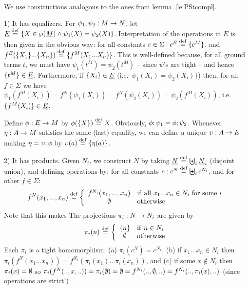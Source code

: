 \documentclass[10pt]{article}
\begin{document}
\begin{Proof}
We use constructions analogous to the ones from
lemma~\ref{le:PStcompl}.

1) It has equalizers. For $\psi_1,\psi_2:M\rightarrow N$, let $\underline {E}\stackrel{{\rm \tiny{def}}}=
\{X\in\wp(\underline {M})\land\psi_1(X)=\psi_2(X)\}$. Interpretation of
the operations in $E$ is then given in the obvious way: for all
constants $c\in\Sigma: c^E\stackrel{{\rm \tiny{def}}}= \{c^M\}$, and $f^E(\{X_1\}...\{X_n\})
\stackrel{{\rm \tiny{def}}}= \{f^M(X_1...X_n)\}$.  This is well-defined because, for all
ground terms $t$, we must have $\psi_1(t^M)=\psi_2(t^M)$ -- since
$\psi$'s are tight -- and hence $\{t^M\}\in\underline {E}$.  Furthermore, if
$\{X_i\}\in\underline {E}$ (i.e.\ $\psi_1(X_i)=\psi_2(X_i)\}$) then, for all
$f\in\Sigma$ we have
$\psi_1(f^M(X_i))=f^N(\psi_1(X_i))=f^N(\psi_2(X_i))=\psi_2(f^M(X_i))$,
i.e.\ $\{f^M(X_i)\}\in \underline {E}$.

Define $\phi:E\rightarrow M$ by $\phi(\{X\})\stackrel{{\rm \tiny{def}}}= X$. Obviously,
$\phi;\psi_1=\phi;\psi_2$. Whenever $\eta:A\rightarrow M$
satisfies the same (last) equality, we can define a unique
$\upsilon:A\rightarrow E$ making $\eta=\upsilon;\phi$ by
$\upsilon(a)\stackrel{{\rm \tiny{def}}}=\{\eta(a)\}$.

2) It has products. Given $N_i$, we construct $N$ by taking $\underline {N}\stackrel{{\rm \tiny{def}}}= \biguplus_i \underline {N}_i$ (disjoint union), and defining operations
by: for all constants $c:c^N\stackrel{{\rm \tiny{def}}}= \biguplus_i c^{N_i}$, and for other
$f\in\Sigma:$
\[ 
f^N(x_1,...,x_n)\stackrel{{\rm \tiny{def}}}= 
\left \{ \begin{array}{cl}
         f^{N_i}(x_1,...,x_n) 
         & {\rm if\ all\ } x_1...x_n\in N_i {\rm \ for\ some\ }i \\ 
         \emptyset 
         & {\rm otherwise} 
         \end{array} 
      \right.
\]
Note that this makes 
The projections $\pi_i:N\rightarrow N_i$ are given by 
\[
\pi_i(n)\stackrel{{\rm \tiny{def}}}= \left \{ \begin{array}{cl} \{n\} & {\rm if\ } n\in N_i \\
\emptyset & {\rm otherwise} \end{array} \right.
\]
Each $\pi_i$ is a tight homomorphism: (a) $\pi_i(c^N)=c^{N_i}$, (b) if
$x_1...x_n\in N_i$ then
$\pi_i(f^N(x_1...x_n))=f^{N_i}(\pi_i(x_1)...\pi_i(x_n))$, and (c) if
some $x\not\in N_i$ then $\pi_i(x)=\emptyset$ so
$\pi_i(f^N(..,x,..))=\pi_i(\emptyset)=\emptyset= f^{N_i}(..,\emptyset,..)=
f^{N_i}(..,\pi_i(x),..)$ (since operations are strict!)



\end{Proof}
\end{document}
